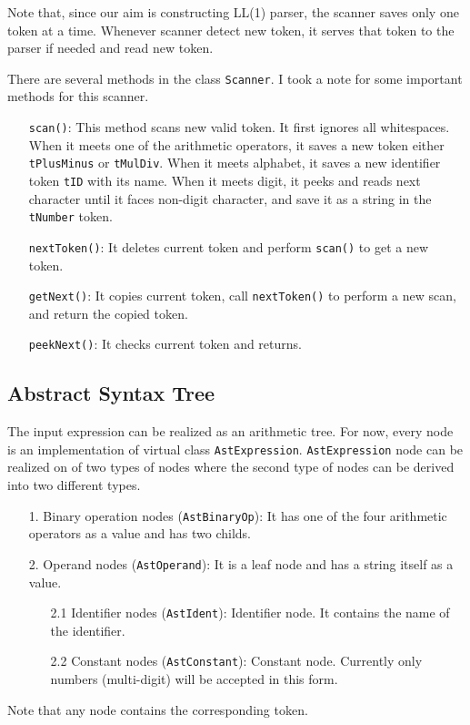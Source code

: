 \documentclass[11pt]{article}
\begin{document}
Note that, since our aim is constructing LL(1) parser, the scanner saves only one token at a time. Whenever scanner detect new token, it serves that token to the parser if needed and read new token.

There are several methods in the class \texttt{Scanner}. I took a note for some important methods for this scanner.
\begin{itemize}
	\item [\texttt{scan()}:] This method scans new valid token. It first ignores all whitespaces. When it meets one of the arithmetic operators, it saves a new token either \texttt{tPlusMinus} or \texttt{tMulDiv}. When it meets alphabet, it saves a new identifier token \texttt{tID} with its name. When it meets digit, it peeks and reads next character until it faces non-digit character, and save it as a string in the \texttt{tNumber} token.
	\item [\texttt{nextToken()}:] It deletes current token and perform \texttt{scan()} to get a new token.
	\item [\texttt{getNext()}:] It copies current token, call \texttt{nextToken()} to perform a new scan, and return the copied token.
	\item [\texttt{peekNext()}:] It checks current token and returns.
\end{itemize}

\subsection{Abstract Syntax Tree} \label{ssec:2.2}
The input expression can be realized as an arithmetic tree. For now, every node is an implementation of virtual class \texttt{AstExpression}. \texttt{AstExpression} node can be realized on of two types of nodes where the second type of nodes can be derived into two different types.
\begin{itemize}
	\item [1.] Binary operation nodes (\texttt{AstBinaryOp}): It has one of the four arithmetic operators as a value and has two childs.
	\item [2.] Operand nodes (\texttt{AstOperand}): It is a leaf node and has a string itself as a value.
	\begin{itemize}
		\item [2.1] Identifier nodes (\texttt{AstIdent}): Identifier node. It contains the name of the identifier.
		\item [2.2] Constant nodes (\texttt{AstConstant}): Constant node. Currently only numbers (multi-digit) will be accepted in this form.
	\end{itemize}
\end{itemize}
Note that any node contains the corresponding token.
\end{document}

